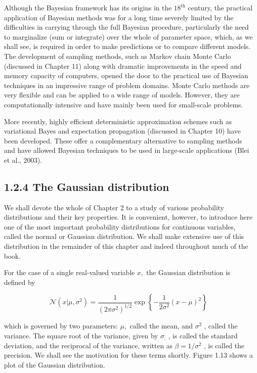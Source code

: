 \documentclass[
  10
]{article}
\begin{document}
Although the Bayesian framework has its origins in the
\(1 8 ^ { \mathrm { t h } }\) century, the practical application of
Bayesian methods was for a long time severely limited by the
difficulties in carrying through the full Bayesian procedure,
particularly the need to marginalize (sum or integrate) over the whole
of parameter space, which, as we shall see, is required in order to make
predictions or to compare different models. The development of sampling
methods, such as Markov chain Monte Carlo (discussed in Chapter 11)
along with dramatic improvements in the speed and memory capacity of
computers, opened the door to the practical use of Bayesian techniques
in an impressive range of problem domains. Monte Carlo methods are very
flexible and can be applied to a wide range of models. However, they are
computationally intensive and have mainly been used for small-scale
problems.

More recently, highly efficient deterministic approximation schemes such
as variational Bayes and expectation propagation (discussed in Chapter
10) have been developed. These offer a complementary alternative to
sampling methods and have allowed Bayesian techniques to be used in
large-scale applications (Blei et al., 2003).

\subsection{1.2.4 The Gaussian
distribution}\label{the-gaussian-distribution}

We shall devote the whole of Chapter 2 to a study of various probability
distributions and their key properties. It is convenient, however, to
introduce here one of the most important probability distributions for
continuous variables, called the normal or Gaussian distribution. We
shall make extensive use of this distribution in the remainder of this
chapter and indeed throughout much of the book.

For the case of a single real-valued variable \(x ,\) the Gaussian
distribution is defined by

\[
\mathcal {N} \left(x | \mu , \sigma^ {2}\right) = \frac {1}{(2 \pi \sigma^ {2}) ^ {1 / 2}} \exp \left\{- \frac {1}{2 \sigma^ {2}} (x - \mu) ^ {2} \right\}\tag{1.46}
\]

which is governed by two parameters: \(\mu ,\) called the mean, and
\(\sigma ^ { 2 }\) , called the variance. The square root of the
variance, given by \(\sigma _ { \mathrm { { : } } }\) , is called the
standard deviation, and the reciprocal of the variance, written as
\(\beta = 1 / \sigma ^ { 2 }\) , is called the precision. We shall see
the motivation for these terms shortly. Figure 1.13 shows a plot of the
Gaussian distribution.
\end{document}
